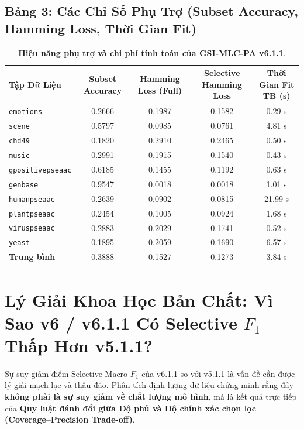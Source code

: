 \documentclass[11pt,a4paper]{article}
\begin{document}
\subsection{Bảng 3: Các Chỉ Số Phụ Trợ (Subset Accuracy, Hamming Loss, Thời Gian Fit)}

\begin{table}[H]
\centering
\small
\caption{\textbf{Hiệu năng phụ trợ và chi phí tính toán của GSI-MLC-PA v6.1.1}.}
\label{tab:secondary_metrics}
\begin{tabular}{lcccc}
\toprule
\textbf{Tập Dữ Liệu} & \textbf{Subset Accuracy} & \textbf{Hamming Loss (Full)} & \textbf{Selective Hamming Loss} & \textbf{Thời Gian Fit TB (s)} \\
\midrule
\texttt{emotions} & 0.2666 & 0.1987 & 0.1582 & 0.29 s \\
\texttt{scene} & 0.5797 & 0.0985 & 0.0761 & 4.81 s \\
\texttt{chd49} & 0.1820 & 0.2910 & 0.2465 & 0.50 s \\
\texttt{music} & 0.2991 & 0.1915 & 0.1540 & 0.43 s \\
\texttt{gpositivepseaac} & 0.6185 & 0.1455 & 0.1192 & 0.63 s \\
\texttt{genbase} & 0.9547 & 0.0018 & 0.0018 & 1.01 s \\
\texttt{humanpseaac} & 0.2639 & 0.0902 & 0.0815 & 21.99 s \\
\texttt{plantpseaac} & 0.2454 & 0.1005 & 0.0924 & 1.68 s \\
\texttt{viruspseaac} & 0.2883 & 0.2029 & 0.1741 & 0.52 s \\
\texttt{yeast} & 0.1895 & 0.2059 & 0.1690 & 6.57 s \\
\midrule
\textbf{Trung bình} & 0.3888 & 0.1527 & 0.1273 & 3.84 s \\
\bottomrule
\end{tabular}
\end{table}

\section{Lý Giải Khoa Học Bản Chất: Vì Sao v6 / v6.1.1 Có Selective \texorpdfstring{$F_1$}{F1} Thấp Hơn v5.1.1?}

Sự suy giảm điểm Selective Macro-$F_1$ của v6.1.1 so với v5.1.1 là vấn đề cần được lý giải mạch lạc và thấu đáo. Phân tích định lượng dữ liệu chứng minh rằng đây \textbf{không phải là sự suy giảm về chất lượng mô hình}, mà là kết quả trực tiếp của \textbf{Quy luật đánh đổi giữa Độ phủ và Độ chính xác chọn lọc (Coverage--Precision Trade-off)}.
\end{document}
